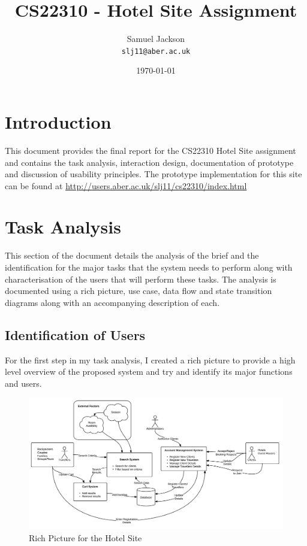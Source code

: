 \documentclass{article}
\begin{document}
\title{CS22310 - Hotel Site Assignment}
\author{Samuel Jackson \\ \texttt{slj11@aber.ac.uk}}
\date{\today}
\maketitle

\section{Introduction}
This document provides the final report for the CS22310 Hotel Site assignment and contains the task analysis, interaction design, documentation of prototype and discussion of usability principles. The prototype implementation for this site can be found at \url{http://users.aber.ac.uk/slj11/cs22310/index.html}

\section{Task Analysis}
This section of the document details the analysis of the brief and the identification for the major tasks that the system needs to perform along with characterisation of the users that will perform these tasks. The analysis is documented using a rich picture, use case, data flow and state transition diagrams along with an accompanying description of each.

\subsection{Identification of Users}
For the first step in my task analysis, I created a rich picture to provide a high level overview of the proposed system and try and identify its major functions and users.

\begin{figure}[H]
\centering
\includegraphics[width=1\textwidth]{img/richpic.png}
\caption{Rich Picture for the Hotel Site}
\label{fig:rich-pic}
\end{figure}
\end{document}
